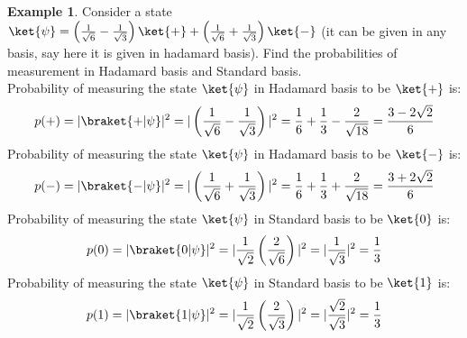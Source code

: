 \documentclass[12pt, oneside]{book}
\theoremstyle{definition}
\theoremstyle{definition}
\newtheorem{example}{Example}[section]
\theoremstyle{remark}
\begin{document}
\begin{example}
    Consider a state $\ket{\psi}=\left(\frac{1}{\sqrt{6}}-\frac{1}{\sqrt{3}}\right)\ket{+}+\left(\frac{1}{\sqrt{6}}+\frac{1}{\sqrt{3}}\right)\ket{-}$ (it can be given in any basis, say here it is given in hadamard basis).
    Find the probabilities of measurement in Hadamard basis and Standard basis.\\
    Probability of measuring the state $\ket{\psi}$ in Hadamard basis to be $\ket{+}$ is:
    \[
        p(+)=|\braket{+|\psi}|^2=|\left(\frac{1}{\sqrt{6}}-\frac{1}{\sqrt{3}}\right)|^2=\frac{1}{6}+\frac{1}{3}-\frac{2}{\sqrt{18}}=\frac{3-2\sqrt{2}}{6}
    \]
    Probability of measuring the state $\ket{\psi}$ in Hadamard basis to be $\ket{-}$ is:
    \[
        p(-)=|\braket{-|\psi}|^2=|\left(\frac{1}{\sqrt{6}}+\frac{1}{\sqrt{3}}\right)|^2=\frac{1}{6}+\frac{1}{3}+\frac{2}{\sqrt{18}}=\frac{3+2\sqrt{2}}{6}
    \]
    Probability of measuring the state $\ket{\psi}$ in Standard basis to be $\ket{0}$ is:
    \[
        p(0)=|\braket{0|\psi}|^2=|\frac{1}{\sqrt{2}}\left(\frac{2}{\sqrt{6}}\right)|^2=|\frac{1}{\sqrt{3}}|^2=\frac{1}{3}
    \]
    Probability of measuring the state $\ket{\psi}$ in Standard basis to be $\ket{1}$ is:
    \[
        p(1)=|\braket{1|\psi}|^2=|\frac{1}{\sqrt{2}}\left(\frac{2}{\sqrt{3}}\right)|^2=|\frac{\sqrt{2}}{\sqrt{3}}|^2=\frac{1}{3}
    \]
\end{example}
\end{document}
